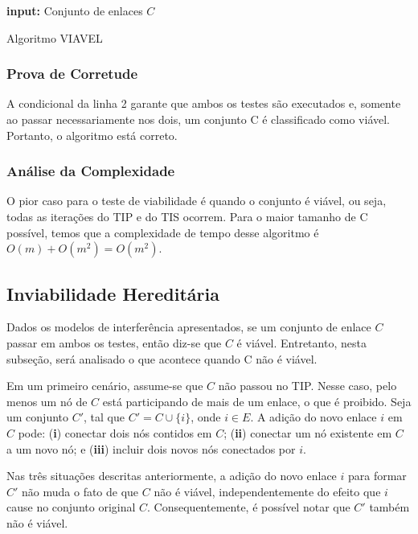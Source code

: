 \begin{algorithm}[h]
	\SetVline
	{\bf input:} Conjunto de enlaces $C$\\
\caption{Algoritmo VIAVEL}
\label{alg:viavel}
\end{algorithm}

\subsubsection{Prova de Corretude}

A condicional da linha 2 garante que ambos os testes são executados e, somente ao passar necessariamente nos dois, um conjunto C é classificado como viável. Portanto, o algoritmo está correto.

\subsubsection{Análise da Complexidade}

O pior caso para o teste de viabilidade é quando o conjunto é viável, ou seja, todas as iterações do TIP e do TIS ocorrem. Para o maior tamanho de C possível, temos que a complexidade de tempo desse algoritmo é $O(m)+O(m^2)=O(m^2)$.

\subsection{Inviabilidade Hereditária}

Dados os modelos de interferência apresentados, se um conjunto de enlace $C$ passar em ambos os testes, então diz-se que $C$ é viável. Entretanto, nesta subseção, será analisado o que acontece quando C não é viável.

Em um primeiro cenário, assume-se que $C$ não passou no TIP. Nesse caso, pelo menos um nó de $C$ está participando de mais de um enlace, o que é proibido. Seja um conjunto $C'$, tal que $C' = C \cup \{i\}$, onde $i \in E$. A adição do novo enlace $i$ em $C$ pode: ({\bf i}) conectar dois nós contidos em $C$; ({\bf ii}) conectar um nó existente em $C$ a um novo nó; e ({\bf iii}) incluir dois novos nós conectados por $i$. 
  
Nas três situações descritas anteriormente, a adição do novo enlace $i$ para formar $C'$ não muda o fato de que $C$ não é viável, independentemente do efeito que $i$ cause no conjunto original $C$. Consequentemente, é possível notar que $C'$ também não é viável.

